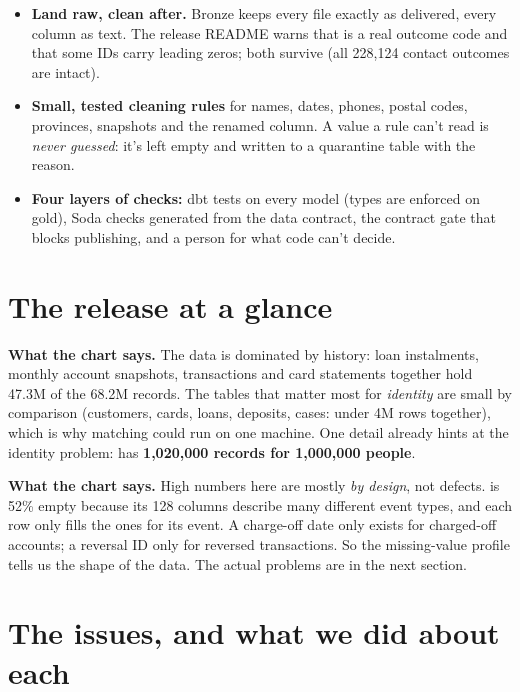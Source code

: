 \documentclass[11pt]{article}
\begin{document}
\begin{itemize}
\item \textbf{Land raw, clean after.} Bronze keeps every file exactly as delivered, every column as text. The release
README warns that  is a real outcome code and that some IDs carry leading zeros; both survive (all 228,124
 contact outcomes are intact).
\item \textbf{Small, tested cleaning rules} for names, dates, phones, postal codes, provinces, snapshots and the renamed
column. A value a rule can't read is \emph{never guessed}: it's left empty and written to a quarantine table with the reason.
\item \textbf{Four layers of checks:} dbt tests on every model (types are enforced on gold), Soda checks generated from
the data contract, the contract gate that blocks publishing, and a person for what code can't decide.
\end{itemize}

\section{The release at a glance}


\textbf{What the chart says.} The data is dominated by history: loan instalments, monthly account snapshots,
transactions and card statements together hold 47.3M of the 68.2M records. The tables that matter most for
\emph{identity} are small by comparison (customers, cards, loans, deposits, cases: under 4M rows together), which is why
matching could run on one machine. One detail already hints at the identity problem:  has
\textbf{1,020,000 records for 1,000,000 people}.


\textbf{What the chart says.} High numbers here are mostly \emph{by design}, not defects.  is
52\% empty because its 128 columns describe many different event types, and each row only fills the ones for its
event. A charge-off date only exists for charged-off accounts; a reversal ID only for reversed transactions. So the
missing-value profile tells us the shape of the data. The actual problems are in the next section.

\section{The issues, and what we did about each}
\end{document}
